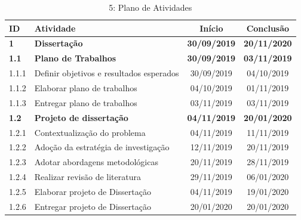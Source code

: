 \begin{table}[H]
    \begin{center}
        \begin{tabular}{| m{1.1cm} | m{8.5cm} | c | c |}
            \hline
        	\textbf{ID} & \textbf{Atividade} & \textbf{Início} & \textbf{Conclusão}\\ [0.5ex]
        	\hline
            \hline
        	\textbf{1} & \textbf{Dissertação} & \textbf{30/09/2019} & \textbf{20/11/2020} \\ \hline
        	\textbf{1.1} & \quad\textbf{Plano de Trabalhos} & \textbf{30/09/2019} & \textbf{03/11/2019} \\ \hline
        	1.1.1 & \quad\quad Definir objetivos e resultados esperados & 30/09/2019 & 04/10/2019 \\ \hline
        	1.1.2 & \quad\quad Elaborar plano de trabalhos & 04/10/2019 & 01/11/2019\\ \hline
        	1.1.3 & \quad\quad Entregar plano de trabalhos & 03/11/2019 & 03/11/2019 \\ \hline
        	\textbf{1.2} & \quad \textbf{Projeto de dissertação} & \textbf{04/11/2019} & \textbf{20/01/2020} \\ \hline
        	1.2.1 & \quad\quad Contextualização do problema & 04/11/2019 & 11/11/2019 \\ \hline
        	1.2.2 & \quad\quad Adoção da estratégia de investigação & 12/11/2019 & 20/11/2019 \\ \hline
        	1.2.3 & \quad\quad Adotar abordagens metodológicas & 20/11/2019 & 28/11/2019 \\ \hline
        	1.2.4 & \quad\quad Realizar revisão de literatura & 29/11/2019 & 06/01/2020 \\ \hline
        	1.2.5 & \quad\quad Elaborar projeto de Dissertação & 04/11/2019 & 19/01/2020 \\ \hline
        	1.2.6 & \quad\quad Entregar projeto de Dissertação & 20/01/2020 & 20/01/2020 \\ \hline
        \end{tabular}
    \end{center}
    \caption[Tabela 5: Plano de Atividades]{5: Plano de Atividades}
\end{table}

